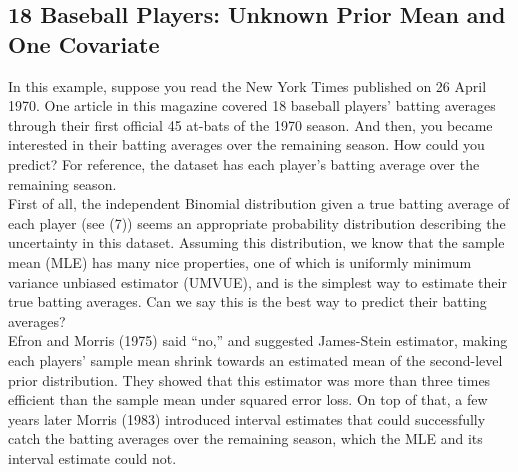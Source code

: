 \documentclass[article]{jss}
\begin{document}


\subsection[Unknown Second-level Mean and One Covariate]{18 Baseball Players: Unknown Prior Mean and One Covariate}
In this example, suppose you read the New York Times published on 26 April 1970. One article in this magazine covered 18 baseball players' batting averages through their first official 45 at-bats of the 1970 season. And then, you became interested in their batting averages over the remaining season. How could you predict? For reference, the dataset   has each player's batting average over the remaining season. 
\\

First of all, the independent Binomial distribution given a true batting average of each player (see (7)) seems an appropriate probability distribution describing the uncertainty in this dataset. Assuming this distribution, we know that the sample mean (MLE) has many nice properties, one of which is uniformly minimum variance unbiased estimator (UMVUE), and is the simplest way to estimate their true batting averages. Can we say this is the best way to predict their batting averages?
\\

Efron and Morris (1975) said ``no,'' and suggested James-Stein estimator, making each players' sample mean shrink towards an estimated mean of the second-level prior distribution. They showed that this estimator was more than three times efficient than the sample mean under squared error loss. On top of that, a few years later Morris (1983) introduced interval estimates that could successfully catch the batting averages over the remaining season, which the MLE and its interval estimate could not.
\\
\end{document}
